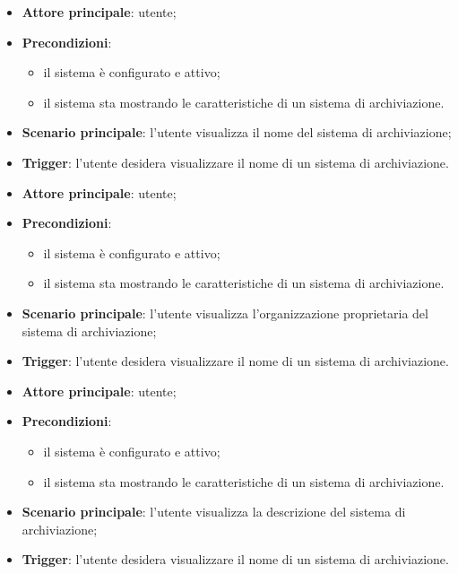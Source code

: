 \documentclass[10pt, a4paper]{article}
\begin{document}
    \begin{itemize}
        \item \textbf{Attore principale}: utente;
        \item \textbf{Precondizioni}:
            \begin{itemize}
                \item il sistema è configurato e attivo;
                \item il sistema sta mostrando le caratteristiche di un sistema di archiviazione.
            \end{itemize}
        \item \textbf{Scenario principale}: l'utente visualizza il nome del sistema di archiviazione;
        \item \textbf{Trigger}: l’utente desidera visualizzare il nome di un sistema di archiviazione.
    \end{itemize}

    \begin{itemize}
        \item \textbf{Attore principale}: utente;
        \item \textbf{Precondizioni}:
            \begin{itemize}
                \item il sistema è configurato e attivo;
                \item il sistema sta mostrando le caratteristiche di un sistema di archiviazione.
            \end{itemize}
        \item \textbf{Scenario principale}: l'utente visualizza l'organizzazione proprietaria del sistema di archiviazione;
        \item \textbf{Trigger}: l’utente desidera visualizzare il nome di un sistema di archiviazione.
    \end{itemize}

    \begin{itemize}
        \item \textbf{Attore principale}: utente;
        \item \textbf{Precondizioni}:
            \begin{itemize}
                \item il sistema è configurato e attivo;
                \item il sistema sta mostrando le caratteristiche di un sistema di archiviazione.
            \end{itemize}
        \item \textbf{Scenario principale}: l'utente visualizza la descrizione del sistema di archiviazione;
        \item \textbf{Trigger}: l’utente desidera visualizzare il nome di un sistema di archiviazione.
    \end{itemize}
\end{document}
